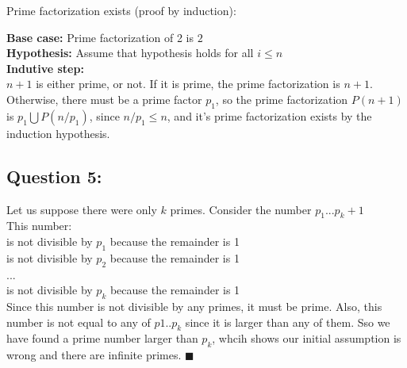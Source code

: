 \documentclass{article}
\newcommand{\qed}{$\blacksquare$}
\begin{document}
\noindent Prime factorization exists (proof by induction): 

\noindent \textbf{Base case:} Prime factorization of 2 is ${2}$ \\
\textbf{Hypothesis:} Assume that hypothesis holds for all $ i \le n $\\
\textbf{Indutive step:}\\
$n+1$ is either prime, or not. 
If it is prime, the prime factorization is ${n+1}$.
Otherwise, there must be a prime factor $p_1$, so the prime factorization $P(n+1)$ is $p_1 \bigcup P(n/p_1)$, since $n/p_1 \le n$, and it's prime factorization exists by the induction hypothesis.

\subsection*{Question 5:}
Let us suppose there were only $k$ primes. Consider the number $p_1...p_k + 1$\\
This number:\\
\indent is not divisible by $p_1$ because the remainder is 1 \\
\indent is not divisible by $p_2$ because the remainder is 1 \\
\indent ...\\
\indent is not divisible by $p_k$ because the remainder is 1 \\

\noindent Since this number is not divisible by any primes, it must be prime. Also, this number is not equal to any of $p1..p_k$ since it is larger than any of them. Sso we have found a prime number larger than $p_k$, whcih shows our initial assumption is wrong and there are infinite primes. \qed
\end{document}
